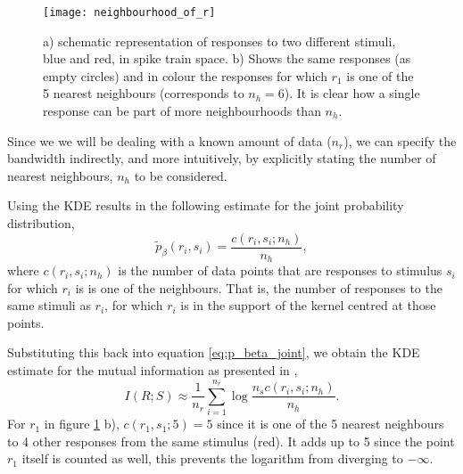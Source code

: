 \documentclass[10pt,a4paper]{book}
\begin{document}
\begin{figure}[b]
\begin{center}
\texttt{[image: neighbourhood\_of\_r]}
\caption{a) schematic representation of responses to two different stimuli, blue and red, in spike train space. b) Shows the same responses (as empty circles) and in colour the responses for which $r_1$ is one of the 5 nearest neighbours (corresponds to $n_h = 6$). It is clear how a single response can be part of more neighbourhoods than $n_h$.}
\label{fig:neighbourhood}
\end{center}
\end{figure}

Since we we will be dealing with a known amount of data ($n_r$), we can specify the bandwidth indirectly, and more intuitively, by explicitly stating the number of nearest neighbours, $n_h$ to be considered.


Using the KDE results in the following estimate for the joint probability distribution,
\begin{equation}
\tilde{p}_{\beta}(r_i, s_i) = \dfrac{c(r_i, s_i; n_h)}{n_h},
\end{equation}
where $c(r_i, s_i; n_h)$ is the number of data points that are responses to stimulus $s_i$ for which $r_i$ is is one of the neighbours. That is, the number of responses to the same stimuli as $r_i$, for which $r_i$ is in the support of the kernel centred at those points.

Substituting this back into equation \ref{eq:p_beta_joint}, we obtain the KDE estimate for the mutual information as presented in \cite{Houghton13},
\begin{equation}
I(R;S) \approx \dfrac{1}{n_r} \sum_{i=1}^{n_r} \log \dfrac{n_s c(r_i, s_i; n_h)}{n_h}.
\end{equation}
%
For $r_1$ in figure \ref{fig:neighbourhood} b), $c(r_1, s_1;5) = 5$ since it is one of the 5 nearest neighbours to 4 other responses from the same stimulus (red). It adds up to 5 since the point $r_1$ itself is counted as well, this prevents the logarithm from diverging to $-\infty$.
\end{document}

